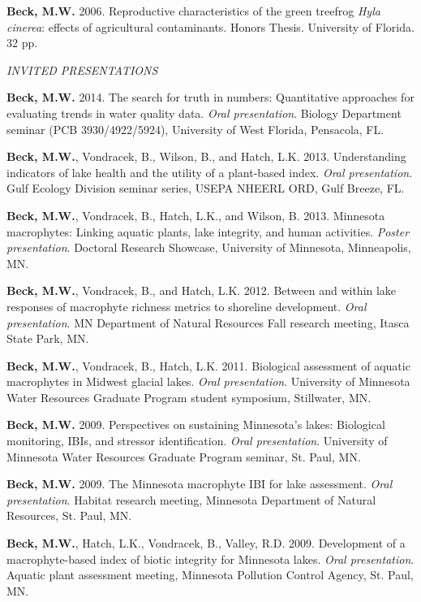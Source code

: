 \documentclass[letterpaper,12pt]{article}
\begin{document}
\textbf{Beck, M.W.} 2006. Reproductive characteristics of the green treefrog \textit{Hyla cinerea}: effects of agricultural contaminants. Honors Thesis. University of Florida. 32 pp.

\vspace{\baselineskip} 
\centerline{\large{\textit{INVITED PRESENTATIONS}}}

{\bf Beck, M.W.} 2014. The search for truth in numbers: Quantitative approaches for evaluating trends in water quality data. \textit{Oral presentation}. Biology Department seminar (PCB 3930/4922/5924), University of West Florida, Pensacola, FL. 

{\bf Beck, M.W.}, Vondracek, B., Wilson, B., and Hatch, L.K. 2013. Understanding indicators of lake health and the utility of a plant-based index. \textit{Oral presentation}. Gulf Ecology Division seminar series, USEPA NHEERL ORD, Gulf Breeze, FL.

{\bf Beck, M.W.}, Vondracek, B., Hatch, L.K., and Wilson, B. 2013. Minnesota macrophytes: Linking aquatic plants, lake integrity, and human activities. \textit{Poster presentation}. Doctoral Research Showcase, University of Minnesota, Minneapolis, MN.

{\bf Beck, M.W.}, Vondracek, B., and Hatch, L.K. 2012. Between and within lake responses of macrophyte richness metrics to shoreline development. \textit{Oral presentation}. MN Department of Natural Resources Fall research meeting, Itasca State Park, MN.

{\bf Beck, M.W.}, Vondracek, B., Hatch, L.K. 2011. Biological assessment of aquatic macrophytes in Midwest glacial lakes. \textit{Oral presentation}. University of Minnesota Water Resources Graduate Program student symposium, Stillwater, MN.

{\bf Beck, M.W.} 2009. Perspectives on sustaining Minnesota's lakes: Biological monitoring, IBIs, and stressor identification. \textit{Oral presentation}. University of Minnesota Water Resources Graduate Program seminar, St. Paul, MN.

{\bf Beck, M.W.} 2009. The Minnesota macrophyte IBI for lake assessment. \textit{Oral presentation}. Habitat research meeting, Minnesota Department of Natural Resources, St. Paul, MN.

{\bf Beck, M.W.}, Hatch, L.K., Vondracek, B., Valley, R.D. 2009. Development of a macrophyte-based index of biotic integrity for Minnesota lakes. \textit{Oral presentation}. Aquatic plant assessment meeting, Minnesota Pollution Control Agency, St. Paul, MN.
\end{document}
